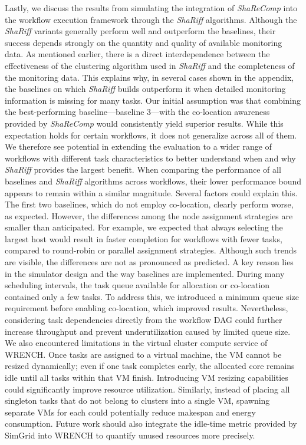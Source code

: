 Lastly, we discuss the results from simulating the integration of \textit{ShaReComp} into the workflow execution framework through the \textit{ShaRiff} algorithms. Although the \textit{ShaRiff} variants generally perform well and outperform the baselines, their success depends strongly on the quantity and quality of available monitoring data. As mentioned earlier, there is a direct interdependence between the effectiveness of the clustering algorithm used in \textit{ShaRiff} and the completeness of the monitoring data. This explains why, in several cases shown in the appendix, the baselines on which \textit{ShaRiff} builds outperform it when detailed monitoring information is missing for many tasks.
Our initial assumption was that combining the best-performing baseline—baseline 3—with the co-location awareness provided by \textit{ShaReComp} would consistently yield superior results. While this expectation holds for certain workflows, it does not generalize across all of them. We therefore see potential in extending the evaluation to a wider range of workflows with different task characteristics to better understand when and why \textit{ShaRiff} provides the largest benefit.
When comparing the performance of all baselines and \textit{ShaRiff} algorithms across workflows, their lower performance bound appears to remain within a similar magnitude. Several factors could explain this. The first two baselines, which do not employ co-location, clearly perform worse, as expected. However, the differences among the node assignment strategies are smaller than anticipated. For example, we expected that always selecting the largest host would result in faster completion for workflows with fewer tasks, compared to round-robin or parallel assignment strategies. Although such trends are visible, the differences are not as pronounced as predicted.
A key reason lies in the simulator design and the way baselines are implemented. During many scheduling intervals, the task queue available for allocation or co-location contained only a few tasks. To address this, we introduced a minimum queue size requirement before enabling co-location, which improved results. Nevertheless, considering task dependencies directly from the workflow DAG could further increase throughput and prevent underutilization caused by limited queue size.
We also encountered limitations in the virtual cluster compute service of WRENCH. Once tasks are assigned to a virtual machine, the VM cannot be resized dynamically; even if one task completes early, the allocated core remains idle until all tasks within that VM finish. Introducing VM resizing capabilities could significantly improve resource utilization. Similarly, instead of placing all singleton tasks that do not belong to clusters into a single VM, spawning separate VMs for each could potentially reduce makespan and energy consumption. Future work should also integrate the idle-time metric provided by SimGrid into WRENCH to quantify unused resources more precisely.
